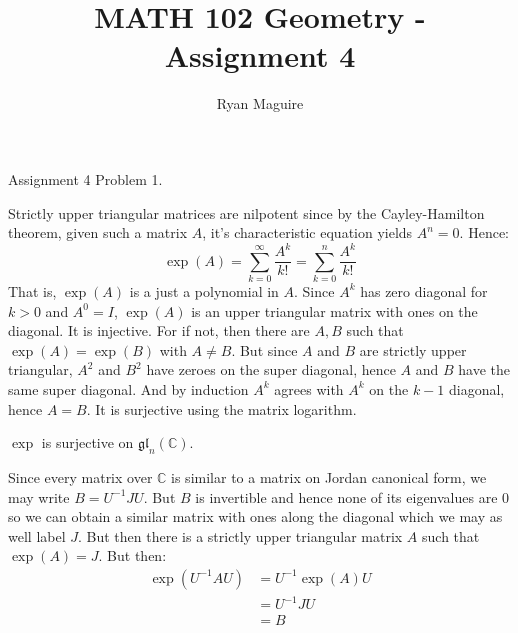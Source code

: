 \documentclass{article}                                                        %
\begin{document}
    \title{MATH 102 Geometry - Assignment 4}
    \author{Ryan Maguire}
    \date{\vspace{-5ex}}
    \maketitle
    \setcounter{section}{4}
    \begin{problem}
        Assignment 4 Problem 1.
    \end{problem}
    \begin{solution}
        Strictly upper triangular matrices are nilpotent since by the
        Cayley-Hamilton theorem, given such a matrix $A$, it's characteristic
        equation yields $A^{n}=0$. Hence:
        \begin{equation}
            \exp(A)=\sum_{k=0}^{\infty}\frac{A^{k}}{k!}
                =\sum_{k=0}^{n}\frac{A^{k}}{k!}
        \end{equation}
        That is, $\exp(A)$ is a just a polynomial in $A$. Since $A^{k}$ has
        zero diagonal for $k>0$ and $A^{0}=I$, $\exp(A)$ is an upper triangular
        matrix with ones on the diagonal. It is injective. For if not, then
        there are $A,B$ such that $\exp(A)=\exp(B)$ with $A\ne{B}$. But since
        $A$ and $B$ are strictly upper triangular, $A^{2}$ and $B^{2}$ have
        zeroes on the super diagonal, hence $A$ and $B$ have the same super
        diagonal. And by induction $A^{k}$ agrees with $A^{k}$ on the
        $k-1$ diagonal, hence $A=B$. It is surjective using the matrix
        logarithm.
    \end{solution}
    \begin{problem}
        $\exp$ is surjective on $\mathfrak{gl}_{n}(\mathbb{C})$.
    \end{problem}
    \begin{solution}
        Since every matrix over $\mathbb{C}$ is similar to a matrix on Jordan
        canonical form, we may write $B=U^{\minus{1}}JU$. But $B$ is invertible
        and hence none of its eigenvalues are 0 so we can obtain a similar
        matrix with ones along the diagonal which we may as well label $J$. But
        then there is a strictly upper triangular matrix $A$ such that
        $\exp(A)=J$. But then:
        \begin{subequations}
            \begin{align}
                \exp(U^{\minus{1}}AU)&=U^{\minus{1}}\exp(A)U\\
                &=U^{\minus{1}}JU\\
                &=B
            \end{align}
        \end{subequations}
    \end{solution}
\end{document}

